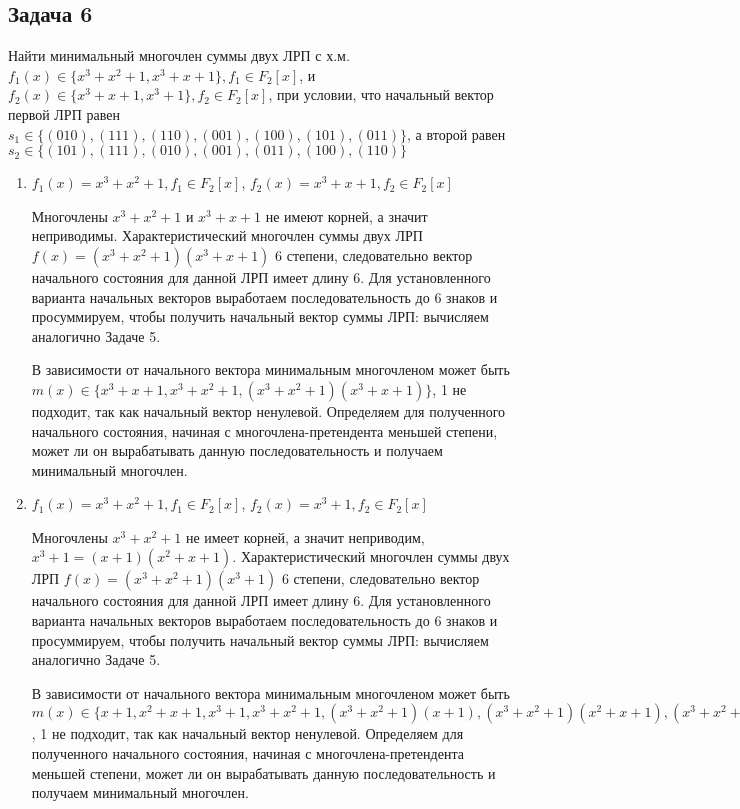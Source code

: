 \documentclass[utf8x, 14pt]{G7-32} %
\begin{document}
\subsection{Задача 6}
Найти минимальный многочлен суммы двух ЛРП с х.м. $f_1(x)\in\{x^3+x^2+1, x^3+x+1\}, f_1\in F_2[x]$, и $f_2(x)\in\{x^3+x+1, x^3+1\}, f_2\in F_2[x]$, при условии, что начальный вектор первой ЛРП равен $s_1 \in \{(010), (111), (110), (001), (100),(101),(011)\}$, а второй равен $s_2 \in\{(101), (111), (010), (001), (011), (100), (110)\}$

\begin{enumerate}
    \item $f_1(x) = x^3+x^2+1, f_1\in F_2[x]$, $f_2(x) = x^3+x+1, f_2\in F_2[x]$
    
     Многочлены $x^3+x^2+1$ и $x^3+x+1$ не имеют корней, а значит неприводимы. Характеристический многочлен суммы двух ЛРП $f(x) = (x^3+x^2+1)(x^3+x+1)$ 6 степени, следовательно вектор начального состояния для данной ЛРП имеет длину 6. Для установленного варианта начальных векторов выработаем последовательность до 6 знаков и просуммируем, чтобы получить начальный вектор суммы ЛРП: вычисляем аналогично Задаче 5.
     
     В зависимости от начального вектора минимальным многочленом может быть $m(x)\in\{x^3+x+1, x^3+x^2+1, (x^3+x^2+1)(x^3+x+1)\}$, 1 не подходит, так как начальный вектор ненулевой. Определяем для полученного начального состояния, начиная с многочлена-претендента меньшей степени, может ли он вырабатывать данную последовательность и получаем минимальный многочлен.
     
     \item $f_1(x) = x^3+x^2+1, f_1\in F_2[x]$, $f_2(x) = x^3+1, f_2\in F_2[x]$
    
     Многочлены $x^3+x^2+1$  не имеет корней, а значит неприводим, $x^3+1 = (x+1)(x^2+x+1)$. Характеристический многочлен суммы двух ЛРП $f(x) = (x^3+x^2+1)(x^3+1)$ 6 степени, следовательно вектор начального состояния для данной ЛРП имеет длину 6. Для установленного варианта начальных векторов выработаем последовательность до 6 знаков и просуммируем, чтобы получить начальный вектор суммы ЛРП: вычисляем аналогично Задаче 5.
     
     В зависимости от начального вектора минимальным многочленом может быть $m(x)\in\{x+1, x^2+x+1, x^3+1, x^3+x^2+1, (x^3+x^2+1)(x+1), (x^3+x^2+1)(x^2+x+1), (x^3+x^2+1)(x^3+1)\}$, 1 не подходит, так как начальный вектор ненулевой. Определяем для полученного начального состояния, начиная с многочлена-претендента меньшей степени, может ли он вырабатывать данную последовательность и получаем минимальный многочлен.
     

\end{enumerate}
\end{document}
